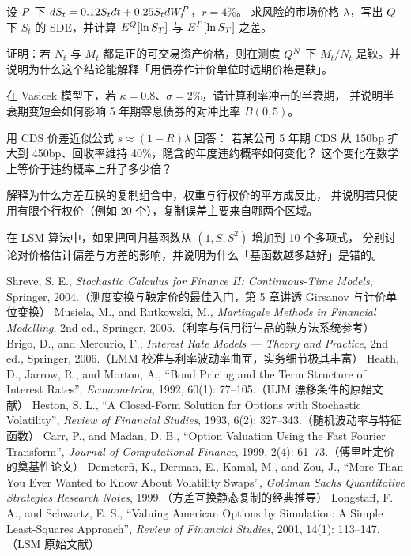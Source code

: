 \begin{exercises}
\item 设 $P$ 下 $d S_t = 0.12S_td t+0.25S_td W_t^{P}$，$r = 4\%$。
求风险的市场价格 $\lambda$，写出 $Q$ 下 $S_t$ 的 SDE，并计算 $E^{Q}[\ln S_T]$ 与 $E^{P}[\ln S_T]$ 之差。

\item 证明：若 $N_t$ 与 $M_t$ 都是正的可交易资产价格，则在测度 $Q^{N}$ 下
$M_t/N_t$ 是鞅。并说明为什么这个结论能解释「用债券作计价单位时远期价格是鞅」。

\item 在 Vasicek 模型下，若 $\kappa = 0.8$、$\sigma = 2\%$，请计算利率冲击的半衰期，
并说明半衰期变短会如何影响 5 年期零息债券的对冲比率 $B(0,5)$。

\item 用 CDS 价差近似公式 $s\approx(1-R)\lambda$ 回答：
若某公司 5 年期 CDS 从 150bp 扩大到 450bp、回收率维持 40\%，隐含的年度违约概率如何变化？
这个变化在数学上等价于违约概率上升了多少倍？

\item 解释为什么方差互换的复制组合中，权重与行权价的平方成反比，
并说明若只使用有限个行权价（例如 20 个），复制误差主要来自哪两个区域。

\item 在 LSM 算法中，如果把回归基函数从 $(1,S,S^2)$ 增加到 10 个多项式，
分别讨论对价格估计偏差与方差的影响，并说明为什么「基函数越多越好」是错的。
\end{exercises}

\begin{furtherreading}
 Shreve, S. E., \emph{Stochastic Calculus for Finance II: Continuous-Time Models}, Springer, 2004.（测度变换与鞅定价的最佳入门，第 5 章讲透 Girsanov 与计价单位变换）
 Musiela, M., and Rutkowski, M., \emph{Martingale Methods in Financial Modelling}, 2nd ed., Springer, 2005.（利率与信用衍生品的鞅方法系统参考）
 Brigo, D., and Mercurio, F., \emph{Interest Rate Models --- Theory and Practice}, 2nd ed., Springer, 2006.（LMM 校准与利率波动率曲面，实务细节极其丰富）
 Heath, D., Jarrow, R., and Morton, A., ``Bond Pricing and the Term Structure of Interest Rates'', \emph{Econometrica}, 1992, 60(1): 77--105.（HJM 漂移条件的原始文献）
 Heston, S. L., ``A Closed-Form Solution for Options with Stochastic Volatility'', \emph{Review of Financial Studies}, 1993, 6(2): 327--343.（随机波动率与特征函数）
 Carr, P., and Madan, D. B., ``Option Valuation Using the Fast Fourier Transform'', \emph{Journal of Computational Finance}, 1999, 2(4): 61--73.（傅里叶定价的奠基性论文）
 Demeterfi, K., Derman, E., Kamal, M., and Zou, J., ``More Than You Ever Wanted to Know About Volatility Swaps'', \emph{Goldman Sachs Quantitative Strategies Research Notes}, 1999.（方差互换静态复制的经典推导）
 Longstaff, F. A., and Schwartz, E. S., ``Valuing American Options by Simulation: A Simple Least-Squares Approach'', \emph{Review of Financial Studies}, 2001, 14(1): 113--147.（LSM 原始文献）
\end{furtherreading}
